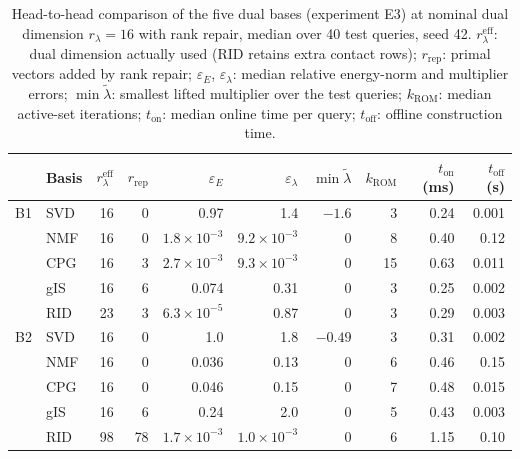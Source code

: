 \documentclass[11pt,a4paper]{article}
\begin{document}
\begin{table}[htbp]
\centering
\footnotesize
\caption{Head-to-head comparison of the five dual bases (experiment E3) at nominal dual dimension $r_\lambda=16$ with rank repair, median over 40 test queries, seed 42. $r_\lambda^{\mathrm{eff}}$: dual dimension actually used (RID retains extra contact rows); $r_{\mathrm{rep}}$: primal vectors added by rank repair; $\varepsilon_E$, $\varepsilon_\lambda$: median relative energy-norm and multiplier errors; $\min\tilde\lambda$: smallest lifted multiplier over the test queries; $k_{\mathrm{ROM}}$: median active-set iterations; $t_{\mathrm{on}}$: median online time per query; $t_{\mathrm{off}}$: offline construction time.}
\label{tab:e3}
\begin{tabular}{@{}llrrrrrrrr@{}}
\toprule
 & Basis & $r_\lambda^{\mathrm{eff}}$ & $r_{\mathrm{rep}}$ & $\varepsilon_E$ & $\varepsilon_\lambda$ & $\min\tilde\lambda$ & $k_{\mathrm{ROM}}$ & $t_{\mathrm{on}}$ (ms) & $t_{\mathrm{off}}$ (s) \\
\midrule
B1 & SVD & 16 & 0 & 0.97 & 1.4 & $-1.6$ & 3 & 0.24 & 0.001 \\
 & NMF & 16 & 0 & $1.8\!\times\!10^{-3}$ & $9.2\!\times\!10^{-3}$ & 0 & 8 & 0.40 & 0.12 \\
 & CPG & 16 & 3 & $2.7\!\times\!10^{-3}$ & $9.3\!\times\!10^{-3}$ & 0 & 15 & 0.63 & 0.011 \\
 & gIS & 16 & 6 & 0.074 & 0.31 & 0 & 3 & 0.25 & 0.002 \\
 & RID & 23 & 3 & $6.3\!\times\!10^{-5}$ & 0.87 & 0 & 3 & 0.29 & 0.003 \\
\midrule
B2 & SVD & 16 & 0 & 1.0 & 1.8 & $-0.49$ & 3 & 0.31 & 0.002 \\
 & NMF & 16 & 0 & 0.036 & 0.13 & 0 & 6 & 0.46 & 0.15 \\
 & CPG & 16 & 0 & 0.046 & 0.15 & 0 & 7 & 0.48 & 0.015 \\
 & gIS & 16 & 6 & 0.24 & 2.0 & 0 & 5 & 0.43 & 0.003 \\
 & RID & 98 & 78 & $1.7\!\times\!10^{-3}$ & $1.0\!\times\!10^{-3}$ & 0 & 6 & 1.15 & 0.10 \\
\bottomrule
\end{tabular}
\end{table}
\end{document}
